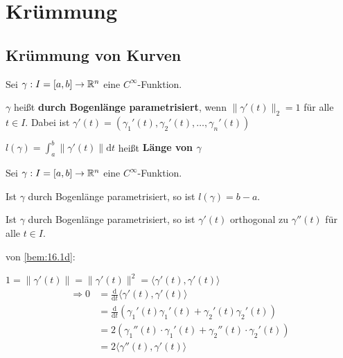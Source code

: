 \chapter{Krümmung}
\section{Krümmung von Kurven}\label{sec:Kurvenkrümmung}
\begin{definition}%
    Sei $\gamma: I = [a, b] \rightarrow \mathbb{R}^n$ eine $C^\infty$-Funktion.
    
    \begin{defenum}
        \item $\gamma$ heißt \textbf{durch Bogenlänge parametrisiert},
              wenn $\|\gamma'(t)\|_2 = 1$ für alle $t \in I$. Dabei
              ist $\gamma'(t) = \left (\gamma_1'(t), \gamma_2'(t), \dots, \gamma_n'(t) \right)$
        \item $l(\gamma) = \int_a^b \|\gamma'(t)\| \mathrm{d} t$ heißt
              \textbf{Länge von $\gamma$}
    \end{defenum}    
\end{definition}

\begin{bemerkung}%
    Sei $\gamma: I = [a, b] \rightarrow \mathbb{R}^n$ eine $C^\infty$-Funktion.

    \begin{bemenum}
        \item Ist $\gamma$ durch Bogenlänge parametrisiert, so ist $l(\gamma) = b-a$.
        \item \label{bem:16.1d} Ist $\gamma$ durch Bogenlänge parametrisiert, so ist 
              $\gamma'(t)$ orthogonal zu $\gamma''(t)$ für alle $t \in I$.
    \end{bemenum}
\end{bemerkung}

\begin{beweis}
    von \cref{bem:16.1d}:

    $1 = \|\gamma'(t)\| = \|\gamma'(t)\|^2 = \langle \gamma'(t), \gamma'(t) \rangle$\\
    \begin{align*}
        \Rightarrow 0 &= \frac{\mathrm{d}}{\mathrm{d}t} \langle \gamma'(t), \gamma'(t) \rangle\\
                      &= \frac{\mathrm{d}}{\mathrm{d}t} (\gamma_1'(t)\gamma_1'(t) + \gamma_2'(t)\gamma_2'(t))\\
                      &= 2 (\gamma_1''(t) \cdot \gamma_1'(t) + \gamma_2''(t) \cdot \gamma_2'(t))\\
                      &= 2 \langle \gamma''(t), \gamma'(t) \rangle
     \end{align*}
\end{beweis}

